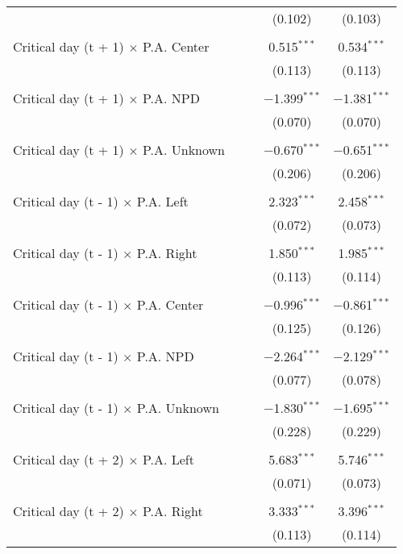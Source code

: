 \documentclass[
]{article}
\begin{document}
\begin{table}[!htbp]
{\begin{tabular}{@{\extracolsep{5pt}}lcccc}
  &  &  & (0.102) & (0.103) \\ 
  & & & & \\ 
 Critical day (t + 1) $\times$ P.A. Center &  &  & 0.515$^{***}$ & 0.534$^{***}$ \\ 
  &  &  & (0.113) & (0.113) \\ 
  & & & & \\ 
 Critical day (t + 1) $\times$ P.A. NPD &  &  & $-$1.399$^{***}$ & $-$1.381$^{***}$ \\ 
  &  &  & (0.070) & (0.070) \\ 
  & & & & \\ 
 Critical day (t + 1) $\times$ P.A. Unknown &  &  & $-$0.670$^{***}$ & $-$0.651$^{***}$ \\ 
  &  &  & (0.206) & (0.206) \\ 
  & & & & \\ 
 Critical day (t - 1) $\times$ P.A. Left &  &  & 2.323$^{***}$ & 2.458$^{***}$ \\ 
  &  &  & (0.072) & (0.073) \\ 
  & & & & \\ 
 Critical day (t - 1) $\times$ P.A. Right &  &  & 1.850$^{***}$ & 1.985$^{***}$ \\ 
  &  &  & (0.113) & (0.114) \\ 
  & & & & \\ 
 Critical day (t - 1) $\times$ P.A. Center &  &  & $-$0.996$^{***}$ & $-$0.861$^{***}$ \\ 
  &  &  & (0.125) & (0.126) \\ 
  & & & & \\ 
 Critical day (t - 1) $\times$ P.A. NPD &  &  & $-$2.264$^{***}$ & $-$2.129$^{***}$ \\ 
  &  &  & (0.077) & (0.078) \\ 
  & & & & \\ 
 Critical day (t - 1) $\times$ P.A. Unknown &  &  & $-$1.830$^{***}$ & $-$1.695$^{***}$ \\ 
  &  &  & (0.228) & (0.229) \\ 
  & & & & \\ 
 Critical day (t + 2) $\times$ P.A. Left &  &  & 5.683$^{***}$ & 5.746$^{***}$ \\ 
  &  &  & (0.071) & (0.073) \\ 
  & & & & \\ 
 Critical day (t + 2) $\times$ P.A. Right &  &  & 3.333$^{***}$ & 3.396$^{***}$ \\ 
  &  &  & (0.113) & (0.114) \\ 

\end{tabular}}
\end{table}
\end{document}
